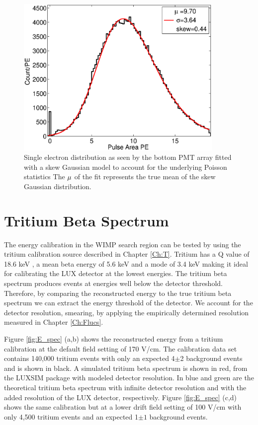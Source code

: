 \begin{figure}[h!]\centering
\includegraphics[width=100mm]{Chapter_E_Scale/Figures/bottom_SE.eps}
\caption{Single electron distribution as seen by the bottom PMT array fitted with a skew Gaussian model to account for the underlying Poisson statistics The $\rm \mu$ of the fit represents the true mean of the skew Gaussian distribution. }
\label{fig:SingleE}
\end{figure}

\newpage

\section{Tritium Beta Spectrum}
\label{sec:E_Thresh}
The energy calibration in the WIMP search region can be tested by using the tritium calibration source described in Chapter \ref{Ch:T}. Tritium has a Q value of 18.6 keV \cite{Tritium_Q}, a mean beta energy of 5.6 keV \cite{Tritium_Mean} and a mode of 3.4 keV \cite{Tritium_Eq} making it ideal for calibrating the LUX detector at the lowest energies. The tritium beta spectrum produces events at energies well below the detector threshold. Therefore, by comparing the reconstructed energy to the true tritium beta spectrum we can extract the energy threshold of the detector. We account for the detector resolution, smearing, by applying the empirically determined resolution measured in Chapter \ref{Ch:Flucs}. 

Figure \ref{fig:E_spec} (a,b) shows the reconstructed energy from a tritium calibration at the default field setting of 170 V/cm. The calibration data set contains 140,000 tritium events with only an expected 4$\pm$2 background events and is shown in black. A simulated tritium beta spectrum is shown in red, from the LUXSIM package with modeled detector resolution.  In blue and green are the theoretical tritium beta spectrum with infinite detector resolution and with the added resolution of the LUX detector, respectively.  Figure \ref{fig:E_spec} (c,d) shows the same calibration but at a lower drift field setting of 100 V/cm with only 4,500 tritium events and an expected 1$\pm 1$ background events.

